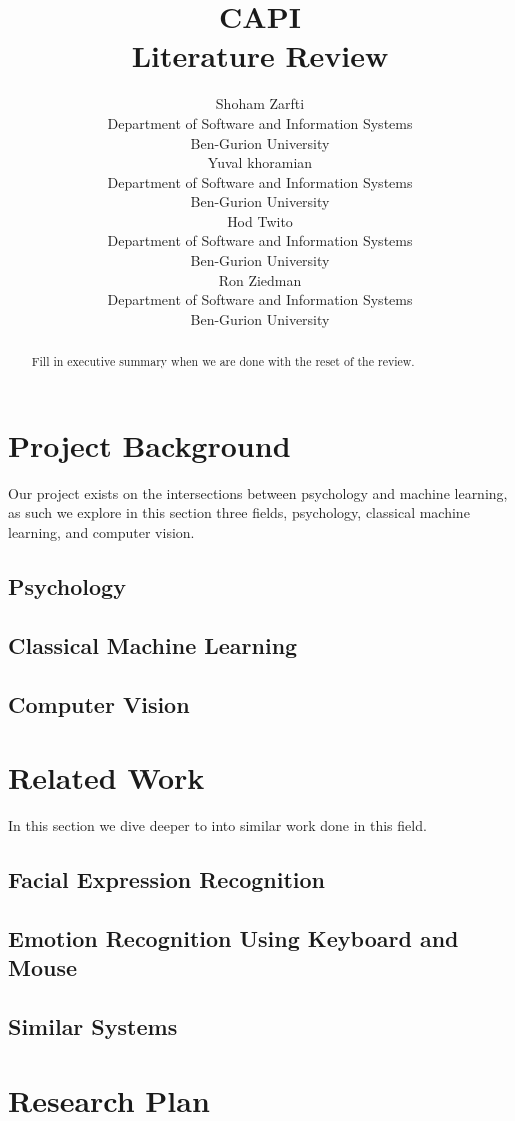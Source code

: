 \documentclass{article}
\title{CAPI \\ Literature Review}
\author{
  Shoham Zarfti \\
  Department of Software and Information Systems \\
  Ben-Gurion University \\
   \And
 Yuval khoramian \\
  Department of Software and Information Systems\\
  Ben-Gurion University \\
  \And
 Hod Twito \\
  Department of Software and Information Systems\\
  Ben-Gurion University \\
  \And
 Ron Ziedman \\
  Department of Software and Information Systems\\
  Ben-Gurion University \\
}
\begin{document}
\maketitle
\begin{abstract}
Fill in executive summary when we are done with the reset of the review.
\end{abstract}



\section{Project Background}
Our project exists on the intersections between psychology and machine learning, as such we explore in this section three fields, psychology, classical machine learning, and computer vision.

\subsection{Psychology}



\subsection{Classical Machine Learning}



\subsection{Computer Vision}



\section{Related Work}
In this section we dive deeper to into similar work done in this field.

\subsection{Facial Expression Recognition}


\subsection{Emotion Recognition Using Keyboard and Mouse}



\subsection{Similar Systems}



\section{Research Plan}




  

\end{document}
